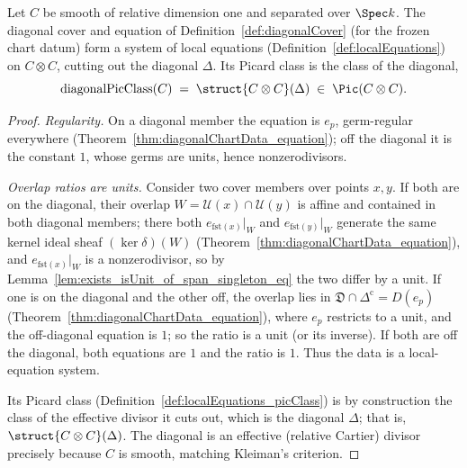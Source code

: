 \begin{theorem}
  \label{thm:diagonalLocalEquations}
  \leanok
  Let \(C\) be smooth of relative dimension one and separated over \(\Spec k\). The diagonal cover
  and equation of Definition~\ref{def:diagonalCover} (for the frozen chart datum) form a system of
  local equations (Definition~\ref{def:localEquations}) on \(C \otimes C\), cutting out the
  diagonal \(\Delta\). Its Picard class is the class of the diagonal,
  \[
    \mathrm{diagonalPicClass}(C) \;=\; \struct{C \otimes C}(\Delta) \;\in\; \Pic(C \otimes C).
  \]
\end{theorem}
\begin{proof}
  \leanok
  \emph{Regularity.} On a diagonal member the equation is \(e_p\), germ-regular everywhere
  (Theorem~\ref{thm:diagonalChartData_equation}); off the diagonal it is the constant \(1\), whose
  germs are units, hence nonzerodivisors.

  \emph{Overlap ratios are units.} Consider two cover members over points \(x, y\). If both are on
  the diagonal, their overlap \(W = \mathcal U(x) \cap \mathcal U(y)\) is affine and contained in
  both diagonal members; there both \(e_{\mathrm{fst}(x)}|_W\) and \(e_{\mathrm{fst}(y)}|_W\)
  generate the same kernel ideal sheaf \((\ker \delta)(W)\)
  (Theorem~\ref{thm:diagonalChartData_equation}), and \(e_{\mathrm{fst}(x)}|_W\) is a nonzerodivisor,
  so by Lemma~\ref{lem:exists_isUnit_of_span_singleton_eq} the two differ by a unit. If one is on
  the diagonal and the other off, the overlap lies in \(\mathfrak D \cap \Delta^{\mathrm c} =
  D(e_p)\) (Theorem~\ref{thm:diagonalChartData_equation}), where \(e_p\) restricts to a unit, and
  the off-diagonal equation is \(1\); so the ratio is a unit (or its inverse). If both are off the
  diagonal, both equations are \(1\) and the ratio is \(1\). Thus the data is a local-equation
  system.

  Its Picard class (Definition~\ref{def:localEquations_picClass}) is by construction the class of
  the effective divisor it cuts out, which is the diagonal \(\Delta\); that is, \(\struct{C \otimes
  C}(\Delta)\). The diagonal is an effective (relative Cartier) divisor precisely because \(C\) is
  smooth, matching Kleiman's criterion.
\end{proof}

